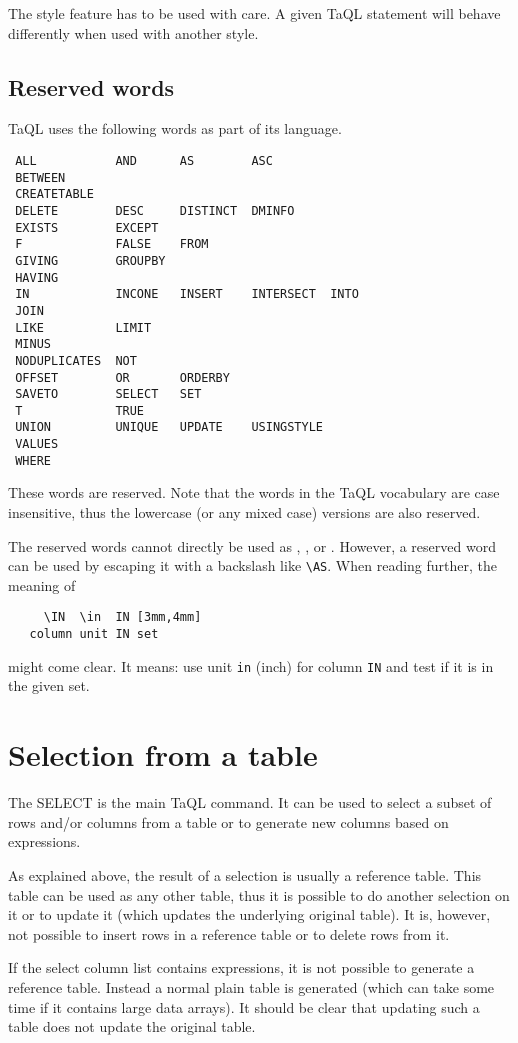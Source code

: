 The style feature has to be used with care. A given TaQL statement will
behave differently when used with another style.

\subsection{\label{TAQL:RESERVEDWORDS}Reserved words}
TaQL uses the following words as part of its language.
\begin{verbatim}
 ALL           AND      AS        ASC
 BETWEEN 
 CREATETABLE
 DELETE        DESC     DISTINCT  DMINFO
 EXISTS        EXCEPT
 F             FALSE    FROM
 GIVING        GROUPBY
 HAVING
 IN            INCONE   INSERT    INTERSECT  INTO
 JOIN
 LIKE          LIMIT
 MINUS
 NODUPLICATES  NOT
 OFFSET        OR       ORDERBY
 SAVETO        SELECT   SET
 T             TRUE
 UNION         UNIQUE   UPDATE    USINGSTYLE
 VALUES 
 WHERE
\end{verbatim}
These words are reserved. Note that the words in the TaQL vocabulary
are case insensitive, 
thus the lowercase (or any mixed case) versions are also reserved.

The reserved words cannot directly be used as
,
, or 
.
However, a reserved word can be used by escaping it with a backslash like
\verb+\+\texttt{AS}. When reading further, the meaning of
\begin{verbatim}
     \IN  \in  IN [3mm,4mm]
   column unit IN set
\end{verbatim}
might come clear. It means: use unit \texttt{in} (inch) for column
\texttt{IN} and test if it is in the given set. 

\section{Selection from a table}
The SELECT is the main TaQL command. It can be used to select a subset
of rows and/or columns from a table or to generate new columns based
on expressions.

As explained above, the result of a selection is usually a reference
table. This table can be used as any other table, thus it is possible
to do another selection on it or to update it (which updates the
underlying original table). It is, however, not possible to insert
rows in a reference table or to delete rows from it.

If the select column list contains expressions, it is not possible to
generate a reference table. Instead a normal plain table is generated
(which can take some time if it contains large data arrays).
It should be clear that updating such a table does not update the
original table.

